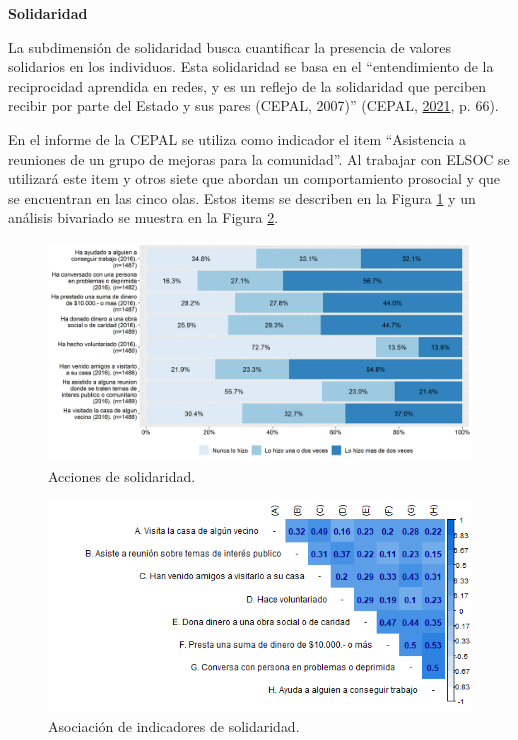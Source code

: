 \documentclass[
  12pt,
]{book}
\begin{document}
\textbf{Solidaridad}

La subdimensión de solidaridad busca cuantificar la presencia de valores solidarios en los individuos. Esta solidaridad se basa en el ``entendimiento de la reciprocidad aprendida en redes, y es un reflejo de la solidaridad que perciben recibir por parte del Estado y sus pares (CEPAL, 2007)'' (CEPAL, \protect\hyperlink{ref-cepal_cohesion_2021}{2021}, p. 66).

En el informe de la CEPAL se utiliza como indicador el item ``Asistencia a reuniones de un grupo de mejoras para la comunidad''. Al trabajar con ELSOC se utilizará este item y otros siete que abordan un comportamiento prosocial y que se encuentran en las cinco olas. Estos items se describen en la Figura \ref{fig:solidaridad} y un análisis bivariado se muestra en la Figura \ref{fig:solidaridad-cor}.

\begin{figure}[H]

{\centering \includegraphics[width=1\linewidth,height=1\textheight]{output/graphs/solidaridad} 

}

\caption{Acciones de solidaridad.}\label{fig:solidaridad}
\end{figure}

\begin{figure}[H]

{\centering \includegraphics[width=1\linewidth,height=1\textheight]{output/graphs/solidaridad_cor} 

}

\caption{Asociación de indicadores de solidaridad.}\label{fig:solidaridad-cor}
\end{figure}
\end{document}
